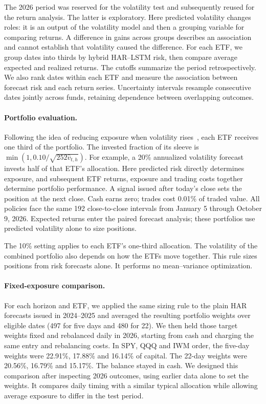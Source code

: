 \documentclass[11pt]{article}
\begin{document}
The 2026 period was reserved for the volatility test and subsequently reused for the return analysis. The latter is exploratory. Here predicted volatility changes roles: it is an output of the volatility model and then a grouping variable for comparing returns. A difference in gains across groups describes an association and cannot establish that volatility caused the difference. For each ETF, we group dates into thirds by hybrid HAR--LSTM risk, then compare average expected and realized returns. The cutoffs summarize the period retrospectively. We also rank dates within each ETF and measure the association between forecast risk and each return series. Uncertainty intervals resample consecutive dates jointly across funds, retaining dependence between overlapping outcomes.

\paragraph{Portfolio evaluation.} Following the idea of reducing exposure when volatility rises~\cite{moreira}, each ETF receives one third of the portfolio. The invested fraction of its sleeve is $\min(1,0.10/\sqrt{252\widehat v_{t,h}})$. For example, a 20\% annualized volatility forecast invests half of that ETF's allocation. Here predicted risk directly determines exposure, and subsequent ETF returns, exposure and trading costs together determine portfolio performance. A signal issued after today's close sets the position at the next close. Cash earns zero; trades cost 0.01\% of traded value. All policies face the same 192 close-to-close intervals from January 5 through October 9, 2026. Expected returns enter the paired forecast analysis; these portfolios use predicted volatility alone to size positions.

The 10\% setting applies to each ETF's one-third allocation. The volatility of the combined portfolio also depends on how the ETFs move together. This rule sizes positions from risk forecasts alone. It performs no mean--variance optimization.

\paragraph{Fixed-exposure comparison.} For each horizon and ETF, we applied the same sizing rule to the plain HAR forecasts issued in 2024--2025 and averaged the resulting portfolio weights over eligible dates (497 for five days and 480 for 22). We then held those target weights fixed and rebalanced daily in 2026, starting from cash and charging the same entry and rebalancing costs. In SPY, QQQ and IWM order, the five-day weights were 22.91\%, 17.88\% and 16.14\% of capital. The 22-day weights were 20.56\%, 16.79\% and 15.17\%. The balance stayed in cash. We designed this comparison after inspecting 2026 outcomes, using earlier data alone to set the weights. It compares daily timing with a similar typical allocation while allowing average exposure to differ in the test period.
\end{document}
